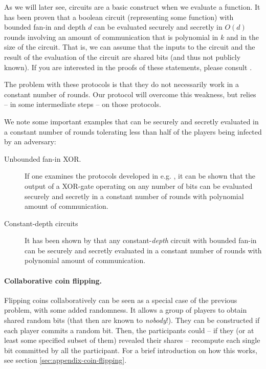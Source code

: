 As we will later see, circuits are a basic construct when we evaluate a function. It has been proven that a boolean circuit (representing some function) with bounded fan-in and depth $d$ can be evaluated securely and secretly in $O(d)$ rounds involving an amount of communication that is polynomial in $k$ and in the size of the circuit. That is, we can assume that the inputs to the circuit and the result of the evaluation of the circuit are shared bits (and thus not publicly known). If you are interested in the proofs of these statements, please consult \cite{rabin-ben-or-verifiable-secret-sharing-number-rounds,beaver-verifiable-secret-sharing,how-to-play-any-mental-game-goldreich-micali-wigderson}.

The problem with these protocols is that they do not necessarily work in a constant number of rounds. Our protocol will overcome this weakness, but relies -- in some intermediate steps -- on those protocols.

We note some important examples that can be securely and secretly evaluated in a constant number of rounds tolerating less than half of the players being infected by an adversary:

\begin{description}
\item[Unbounded fan-in XOR.] If one examines the protocols developed in e.g. \cite{completeness-theorems-non-crypto-fault-tolerant,rabin-ben-or-verifiable-secret-sharing-number-rounds}, it can be shown that the output of a XOR-gate operating on any number of bits can be evaluated securely and secretly in a constant number of rounds with polynomial amount of communication.
\item[Constant-depth circuits] It has been shown by \cite{rabin-ben-or-verifiable-secret-sharing-number-rounds} that any constant-\emph{depth} circuit with bounded fan-in can be securely and secretly evaluated in a constant number of rounds with polynomial amount of communication.
\end{description}

\paragraph{Collaborative coin flipping.}

Flipping coins collaboratively can be seen as a special case of the previous problem, with some added randomness. It allows a group of players to obtain shared random bits (that then are known to \emph{nobody}!). They can be constructed if each player commits a random bit. Then, the participants could -- if they (or at least some specified subset of them) revealed their shares -- recompute each single bit committed by all the participant. For a brief introduction on how this works, see section \ref{sec:appendix-coin-flipping}.


